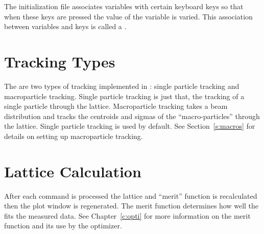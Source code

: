 The  initialization file associates variables with
certain keyboard keys so that when these keys are pressed the value of
the variable is varied. This association between variables and keys is
called a .

\section{Tracking Types}

The are two types of tracking implemented in \tao: single particle tracking and
macroparticle tracking. Single particle tracking is just that, the tracking 
of a single particle through the lattice. Macroparticle tracking takes a beam distribution
and tracks the centroids and sigmas of the ``macro-particles'' through the lattice.
Single particle tracking is used by default. See Section~\ref{s:macros} for details on
setting up macroparticle tracking.

\section{Lattice Calculation}
\label{s:lat_calc}

After each \tao command is processed the lattice and ``merit'' function is 
recalculated then the plot window is regenerated. The
merit function determines how well the  fits the measured data. See
Chapter~\ref{c:opti} for more information on the merit function and its use by
the optimizer. 

